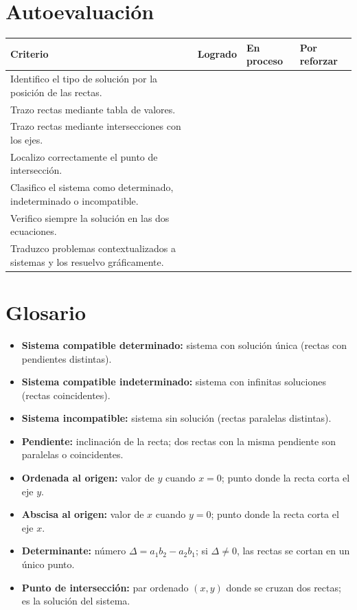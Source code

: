 \documentclass[12pt]{article}
\begin{document}
\section{Autoevaluación}

\begin{center}
\begin{tabular}{p{7.4cm}p{2cm}p{2cm}p{2cm}}
\toprule
Criterio & Logrado & En proceso & Por reforzar \\
\midrule
Identifico el tipo de solución por la posición de las rectas. & & & \\
Trazo rectas mediante tabla de valores. & & & \\
Trazo rectas mediante intersecciones con los ejes. & & & \\
Localizo correctamente el punto de intersección. & & & \\
Clasifico el sistema como determinado, indeterminado o incompatible. & & & \\
Verifico siempre la solución en las dos ecuaciones. & & & \\
Traduzco problemas contextualizados a sistemas y los resuelvo gráficamente. & & & \\
\bottomrule
\end{tabular}
\end{center}

\section{Glosario}

\begin{itemize}
  \item \textbf{Sistema compatible determinado:} sistema con solución única (rectas con pendientes distintas).
  \item \textbf{Sistema compatible indeterminado:} sistema con infinitas soluciones (rectas coincidentes).
  \item \textbf{Sistema incompatible:} sistema sin solución (rectas paralelas distintas).
  \item \textbf{Pendiente:} inclinación de la recta; dos rectas con la misma pendiente son paralelas o coincidentes.
  \item \textbf{Ordenada al origen:} valor de \(y\) cuando \(x=0\); punto donde la recta corta el eje \(y\).
  \item \textbf{Abscisa al origen:} valor de \(x\) cuando \(y=0\); punto donde la recta corta el eje \(x\).
  \item \textbf{Determinante:} número \(\Delta=a_1b_2-a_2b_1\); si \(\Delta\ne 0\), las rectas se cortan en un único punto.
  \item \textbf{Punto de intersección:} par ordenado \((x,y)\) donde se cruzan dos rectas; es la solución del sistema.
\end{itemize}
\end{document}
